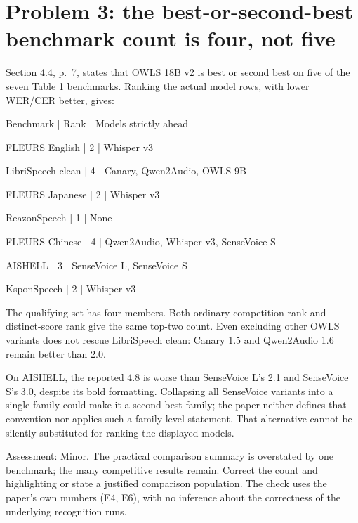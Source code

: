 \documentclass[10pt]{article}
\begin{document}
\section*{Problem 3: the best-or-second-best benchmark count is four, not five}
Section 4.4, p. 7, states that OWLS 18B v2 is best or second best on five of the seven Table 1 benchmarks. Ranking the actual model rows, with lower WER/CER better, gives:\par
Benchmark | Rank | Models strictly ahead\par
FLEURS English | 2 | Whisper v3\par
LibriSpeech clean | 4 | Canary, Qwen2Audio, OWLS 9B\par
FLEURS Japanese | 2 | Whisper v3\par
ReazonSpeech | 1 | None\par
FLEURS Chinese | 4 | Qwen2Audio, Whisper v3, SenseVoice S\par
AISHELL | 3 | SenseVoice L, SenseVoice S\par
KsponSpeech | 2 | Whisper v3\par
The qualifying set has four members. Both ordinary competition rank and distinct-score rank give the same top-two count. Even excluding other OWLS variants does not rescue LibriSpeech clean: Canary 1.5 and Qwen2Audio 1.6 remain better than 2.0.\par
On AISHELL, the reported 4.8 is worse than SenseVoice L’s 2.1 and SenseVoice S’s 3.0, despite its bold formatting. Collapsing all SenseVoice variants into a single family could make it a second-best family; the paper neither defines that convention nor applies such a family-level statement. That alternative cannot be silently substituted for ranking the displayed models.\par
Assessment: Minor. The practical comparison summary is overstated by one benchmark; the many competitive results remain. Correct the count and highlighting or state a justified comparison population. The check uses the paper’s own numbers (E4, E6), with no inference about the correctness of the underlying recognition runs.\par
\end{document}
